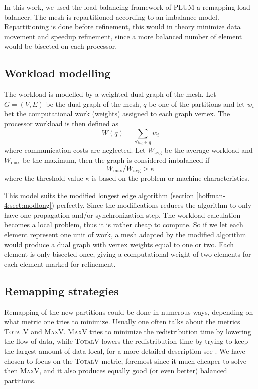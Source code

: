 In this work, we used the load balancing framework of PLUM
\cite{Oliker1998} a remapping load balancer. The mesh is repartitioned
according to an imbalance model. Repartitioning is done before
refinement, this would in theory minimize data movement and speedup
refinement, since a more balanced number of element would be bisected
on each processor.

\subsection{Workload modelling}
The workload is modelled by a weighted dual graph of the mesh. Let
$G=(V,E)$ be the dual graph of the mesh, $q$ be one of the partitions
and let $w_i$ bet the computational work (weights) assigned to each
graph vertex. The processor workload is then defined as
\begin{equation}
  \label{hoffman-4:eq:compwork}
  W(q) = \sum_{\forall w_i \in q} w_i
\end{equation}
where communication costs are neglected. Let $W_\textrm{avg}$ be the average
workload and $W_\textrm{max}$ be the maximum, then the graph is considered
imbalanced if
\begin{equation}
  \label{hoffman-4:eq:imbalancefactor}
  W_\textrm{max} /  W_\textrm{avg}  > \kappa
\end{equation}
where the threshold value $\kappa$ is based on the problem or machine characteristics.

This model suits the modified longest edge algorithm (section
\ref{hoffman-4:sect:modlong}) perfectly. Since the modifications reduces the
algorithm to only have one propagation and/or synchronization
step. The workload calculation becomes a local problem, thus it is
rather cheap to compute. So if we let each element represent one unit
of work, a mesh adapted by the modified algorithm would produce a dual
graph with vertex weights equal to one or two. Each element is only
bisected once, giving a computational weight of two elements for each
element marked for refinement.

\subsection{Remapping strategies}
\label{hoffman-4:sect:intemap}

Remapping of the new partitions could be done in numerous ways,
depending on what metric one tries to minimize. Usually one often
talks about the metrics \textsc{TotalV} and
\textsc{MaxV}. \textsc{MaxV} tries to minimize the redistribution time
by lowering the flow of data, while \textsc{TotalV} lowers the
redistribution time by trying to keep the largest amount of data
local, for a more detailed description see \cite{Oliker1998}. We have
chosen to focus on the \textsc{TotalV} metric, foremost since it much
cheaper to solve then \textsc{MaxV}, and it also produces equally good (or
even better) balanced partitions.

